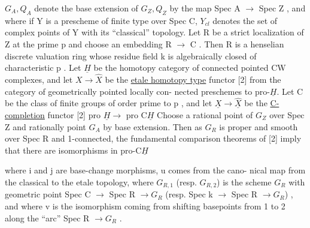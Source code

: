
$G_A,Q_A$ denote the base extension of $G_Z,Q_Z$ by the map Spec A $\to$
Spec Z , and where if Y is a prescheme of finite type over Spec C,
$Y_{cl}$ denotes the set of complex points of Y with its ``classical''
topology. Let R be a strict localization of Z at the prime p
and choose an embedding R $\to$ C . Then R is a henselian discrete
valuation ring whose residue field k is algebraically closed of
characteristic p . Let $\underline{H}$ be the homotopy category of connected
pointed CW complexes, and let $X \to \hat{X}$ be the \uline{etale homotopy type}
functor [2] from the category of geometrically pointed locally con-%
nected preschemes to pro-$\underline{H}$. Let C be the class of finite groups
of order prime to p , and let $\underline{X} \to \hat{\underline{X}}$ be the \uline{C-completion} functor
[2] pro $\underline{H} \to$ pro C$\underline{H}$  Choose a rational point of $G_Z$ over Spec Z
and rationally point $G_A$ by base extension. Then as $G_R$ is proper
and smooth over Spec R and 1-connected, the fundamental comparison
theorems of [2] imply that there are isomorphisms in pro-C$\underline{H}$


where i and j are base-change morphisms, u comes from the cano-%
nical map from the classical to the etale topology, where $G_{R,1}$
(resp. $G_{R,2}$) is the scheme $G_R$ with geometric point Spec C $\to$
Spec R $\to G_R$ (resp. Spec k $\to$ Spec R $\to G_R$) , and where v is the
isomorphism coming from shifting basepoints from 1 to 2 along the
``arc'' Spec R $\to G_R$ .


